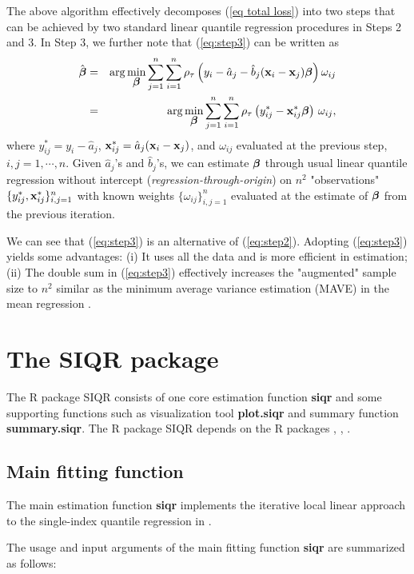 The above algorithm effectively decomposes (\ref{eq total loss}) into two steps that can be achieved by two standard linear quantile regression procedures in  Steps 2 and 3. In Step 3, we further note that (\ref{eq:step3}) can be written as
\begin{eqnarray*}
	\hat{\mbox{\boldmath$\beta$}}&=&\arg\min_{\mbox{\boldmath$\beta$}} \sum_{j=1}^n\sum_{i=1}^n\rho_\tau\left(y_i-{\hat a}_j-{\hat b}_j({\bf x}_i-{\bf x}_j)\mbox{\boldmath$\beta$}\right)\omega_{ij}
	\\&=&\arg\min_{\mbox{\boldmath$\beta$}}\sum_{j=1}^n\sum_{i=1}^n\rho_\tau\left(y_{ij}^*-{{\bf x}_{ij}^*}\mbox{\boldmath$\beta$}\right)\,\omega_{ij},
\end{eqnarray*}
where $y_{ij}^*=y_i-{\hat a}_j$, ${\bf x}_{ij}^*={\hat a}_j({\bf x}_i-{\bf x}_j)$, and $\omega_{ij}$ evaluated at the previous step, $i,j=1,\cdots,n$.
Given ${\hat a}_j$'s and ${\hat b}_j$'s, we can estimate $\mbox{\boldmath$\beta$}$ through usual linear quantile regression without intercept ({\it regression-through-origin}) on $n^2$ "observations" $\{y_{ij}^*,{{\bf x}}_{ij}^*\}_{i,j=1}^n$ with known weights $\{\omega_{ij}\}_{i,j=1}^n$ evaluated at the estimate of $\mbox{\boldmath$\beta$}$ from the previous iteration.

We can see that (\ref{eq:step3}) is an alternative of (\ref{eq:step2}). Adopting (\ref{eq:step3}) yields some  advantages: (i) It uses all the data and is more efficient in estimation; (ii) The double sum in (\ref{eq:step3}) effectively increases the "augmented" sample size to $n^2$ similar as the minimum average variance
estimation (MAVE) in the mean regression \citep{xia_semi-parametric_2006}.


\section{The SIQR package}
The R package SIQR consists of one core estimation function \textbf{siqr} and some supporting functions such as visualization tool \textbf{plot.siqr} and summary function \textbf{summary.siqr}. The R package SIQR depends on the R packages , , .

\subsection{Main fitting function}

The main estimation function \textbf{siqr} implements the iterative local linear approach to the single-index quantile regression in \cite{wu_single-index_2010}. 

The usage and input arguments of the main fitting function \textbf{siqr} are summarized as follows:

